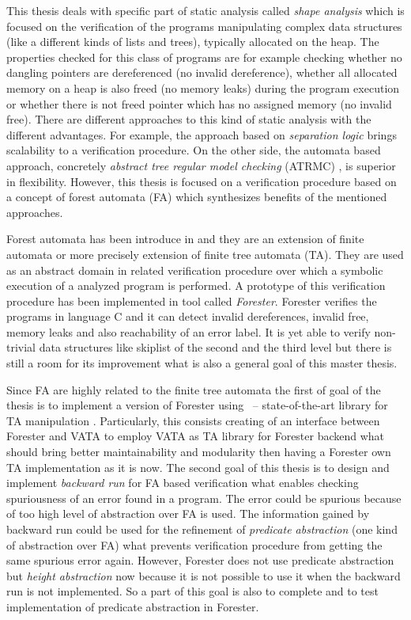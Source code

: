 This thesis deals with specific part of static analysis called \emph{shape analysis} which is focused on the verification of the programs manipulating
complex data structures (like a different kinds of lists and trees), typically allocated on the heap.
The properties checked for this class of programs are for example checking whether no dangling
pointers are dereferenced (no invalid dereference), whether all allocated memory on a heap is also freed (no memory leaks)
during the program execution or whether there is not freed pointer which has no assigned memory (no invalid free).
There are different approaches to this kind of static analysis with the different advantages.
For example, the approach based on \emph{separation logic} \cite{seplog,seplog07} brings scalability to a verification procedure.
On the other side, the automata based approach, concretely \emph{abstract tree regular model checking} (ATRMC) \cite{artmc}, is
superior in flexibility.
However, this thesis is focused on a verification procedure based on a concept of forest automata (FA) which
synthesizes benefits of the mentioned approaches.

Forest automata has been introduce in \cite{forester11,forester12} and they are an extension of finite automata or more precisely extension of finite tree automata (TA).
They are used as an abstract domain in related verification procedure over which a symbolic execution of a analyzed program is performed.
A prototype of this verification procedure has been implemented in tool called \emph{Forester}.
Forester verifies the programs in language C and it can detect invalid dereferences, invalid free, memory leaks and also reachability of an error label.
It is yet able to verify non-trivial data structures like skiplist of the second and the third level
but there is still a room for its improvement what is also a general goal of this master thesis.

Since FA are highly related to the finite tree automata the first of goal of the thesis is to implement
a version of Forester using \vata\ -- state-of-the-art library for TA manipulation \cite{libvata}.
Particularly, this consists creating of an interface between Forester and VATA to employ VATA as TA library for Forester backend
what should bring better maintainability and modularity then having a Forester own TA implementation as it is now.
The second goal of this thesis is to design and implement \emph{backward run} for FA based verification what enables checking spuriousness of an error found in a program.
The error could be spurious because of too high level of abstraction over FA is used.
The information gained by backward run could be used for the refinement of \emph{predicate abstraction} (one kind of abstraction over FA)
what prevents verification procedure from getting the same spurious error again.
However, Forester does not use predicate abstraction but \emph{height abstraction} now because it is not possible to use it when the backward run is not implemented.
So a part of this goal is also to complete and to test implementation of predicate abstraction in Forester.

